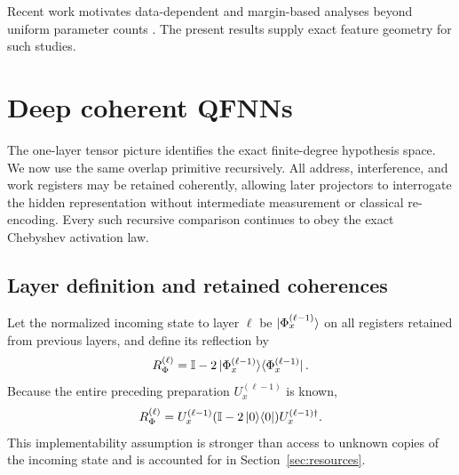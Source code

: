 \documentclass[pdflatex,sn-mathphys,NameDate,iicol]{sn-jnl}
\newcommand{\id}{\mathbb{I}}
\newcommand{\proj}[1]{\ket{#1}\!\bra{#1}}
\begin{document}
Recent work motivates data-dependent and margin-based analyses beyond uniform
parameter counts \citep{gilfuster2024rethinking,hur2025margins}. The present
results supply exact feature geometry for such studies.

\section{Deep coherent QFNNs}
\label{sec:deep}

The one-layer tensor picture identifies the exact finite-degree hypothesis
space. We now use the same overlap primitive recursively. All address,
interference, and work registers may be retained coherently, allowing later
projectors to interrogate the hidden representation without intermediate
measurement or classical re-encoding. Every such recursive comparison
continues to obey the exact Chebyshev activation law.

\subsection{Layer definition and retained coherences}

Let the normalized incoming state to layer $\ell$ be
$\ket{\Phi_x^{(\ell-1)}}$ on all registers retained from previous layers,
and define its reflection by
\begin{equation}
  R_{\Phi}^{(\ell)}
  =\id-2\proj{\Phi_x^{(\ell-1)}}.
  \label{eq:current-reflection}
\end{equation}
Because the entire preceding preparation $U_x^{(\ell-1)}$ is known,
\begin{equation}
  R_{\Phi}^{(\ell)}
  =U_x^{(\ell-1)}(\id-2\proj0)
   U_x^{(\ell-1)\dagger}.
  \label{eq:current-reflection-implementation}
\end{equation}
This implementability assumption is stronger than access to unknown copies
of the incoming state and is accounted for in Section~\ref{sec:resources}.
\end{document}

